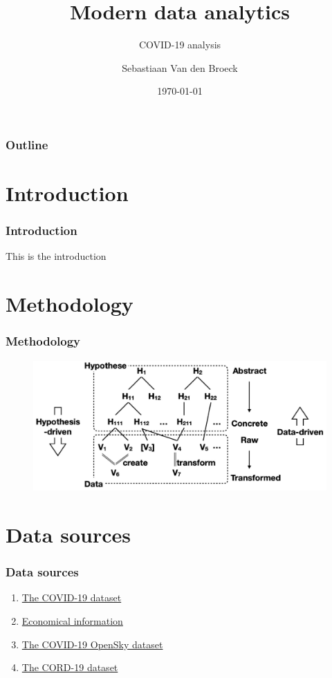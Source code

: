 \documentclass{beamer}
\title{Modern data analytics}
\subtitle{COVID-19 analysis}
\author{Sebastiaan Van den Broeck}
\institute{KUL}
\date{\today}
\begin{document}
\begin{frame}
\titlepage
\end{frame}

\begin{frame}
\frametitle{Outline}
\tableofcontents
\end{frame}

\section{Introduction}
\begin{frame}
\frametitle{Introduction}
This is the introduction
\end{frame}

\section{Methodology}
\begin{frame}
\frametitle{Methodology}

\begin{figure}
\centering
\includegraphics[width=0.8\linewidth]{../visualizations/hypothesis_space_data_space.png}
\end{figure}

\end{frame}

\section{Data sources}
\begin{frame}
\frametitle{Data sources}

\begin{enumerate}
\item \href{https://github.com/nytimes/covid-19-data}{The COVID-19 dataset}
\item \href{https://apps.bea.gov/regional/downloadzip.cfm}{Economical information}
\item \href{https://zenodo.org/record/6411336\#.YvUG14VBzCl}{The COVID-19 OpenSky dataset}
\item \href{https://github.com/allenai/cord19}{The CORD-19 dataset}
\end{enumerate}

\end{frame}
\end{document}
